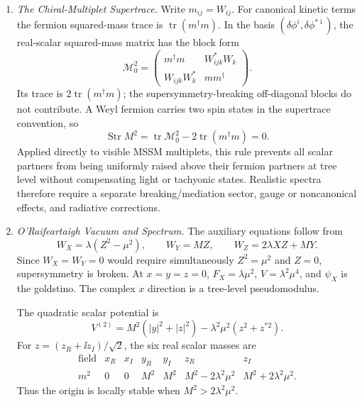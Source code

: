 \begin{enumerate}
  \begin{enumerate}
    \item \emph{The Chiral-Multiplet Supertrace.}
    Write \(m_{ij}=W_{ij}\).  For canonical kinetic terms the fermion
      squared-mass trace is
      \(\operatorname{tr}(m^\dagger m)\).  In the basis
      \((\delta\phi^i,\delta\phi^{*\bar\imath})\), the real-scalar
      squared-mass matrix has the block form
      \[
        \mathcal M_0^2=
        \begin{pmatrix}
          m^\dagger m&W_{ijk}^*W_k\\
          W_{ijk}W_k^*&mm^\dagger
        \end{pmatrix}.
      \]
      Its trace is \(2\operatorname{tr}(m^\dagger m)\); the
      supersymmetry-breaking off-diagonal blocks do not contribute.
      A Weyl fermion carries two spin states in the supertrace convention, so
      \[
        \operatorname{Str}M^2
          =\operatorname{tr}\mathcal M_0^2
           -2\operatorname{tr}(m^\dagger m)=0.
      \]
      Applied directly to visible MSSM multiplets, this rule prevents all
      scalar partners from being uniformly raised above their fermion
      partners at tree level without compensating light or tachyonic states.
      Realistic spectra therefore require a separate breaking/mediation
      sector, gauge or noncanonical effects, and radiative corrections.
    \item \emph{O'Raifeartaigh Vacuum and Spectrum.}
    The auxiliary equations follow from
      \[
        W_X=\lambda(Z^2-\mu^2),\qquad
        W_Y=MZ,\qquad
        W_Z=2\lambda XZ+MY .
      \]
      Since \(W_X=W_Y=0\) would require simultaneously \(Z^2=\mu^2\) and
      \(Z=0\), supersymmetry is broken.  At \(x=y=z=0\),
      \(F_X=\lambda\mu^2\), \(V=\lambda^2\mu^4\), and \(\psi_X\) is the
      goldstino.  The complex \(x\) direction is a tree-level pseudomodulus.

      The quadratic scalar potential is
      \[
        V^{(2)}
          =M^2(|y|^2+|z|^2)
             -\lambda^2\mu^2(z^2+z^{*2}).
      \]
      For \(z=(z_R+\ii z_I)/\sqrt2\), the six real scalar masses are
      \[
      \begin{array}{c|cccccc}
        \text{field}&x_R&x_I&y_R&y_I&z_R&z_I\\ \hline
        m^2&0&0&M^2&M^2&
          M^2-2\lambda^2\mu^2&M^2+2\lambda^2\mu^2 .
      \end{array}
      \]
      Thus the origin is locally stable when
      \(M^2>2\lambda^2\mu^2\).


\end{enumerate}
\end{enumerate}
